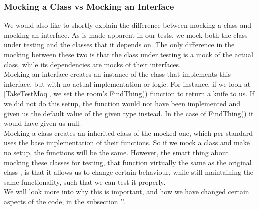 \subsubsection{Mocking a Class vs Mocking an Interface} \label{MockingVsSection}
We would also like to shortly explain the difference between mocking a class and mocking an interface. As is made apparent in our tests, we mock both the class under testing and the classes that it depends on. The only difference in the mocking between these two is that the class under testing is a mock of the actual class, while its dependencies are mocks of their interfaces. \\
Mocking an interface creates an instance of the class that implements this interface, but with no actual implementation or logic. For instance, if we look at \autoref{TakeTestMoq}, we set the room's FindThing() function to return a knife to us. If we did not do this setup, the function would not have been implemented and given us the default value of the given type instead. In the case of FindThing() it would have given us null. \\
Mocking a class creates an inherited class of the mocked one, which per standard uses the base implementation of their functions. So if we mock a class and make no setup, the functions will be the same. However, the smart thing about mocking these classes for testing, that function virtually the same as the original class , is that it allows us to change certain behaviour, while still maintaining the same functionality, such that we can test it properly. \\
We will look more into why this is important, and how we have changed certain aspects of the code, in the subsection ''. 

